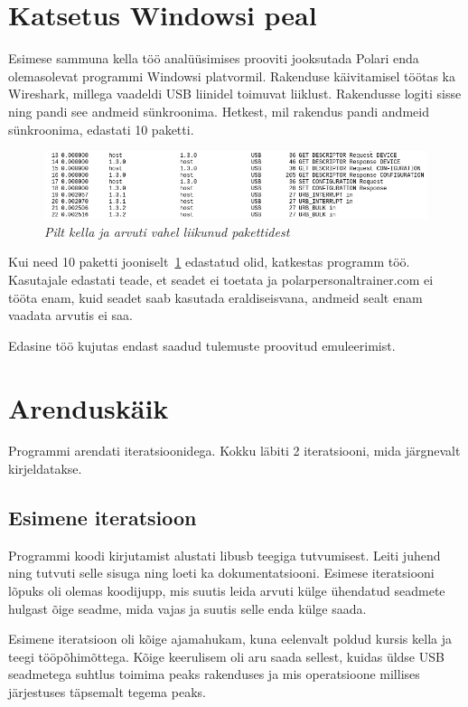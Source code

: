 
\section{Katsetus Windowsi peal}\label{sec:katsetus}
Esimese sammuna kella töö analüüsimises prooviti jooksutada Polari enda olemasolevat programmi Windowsi platvormil.
Rakenduse käivitamisel töötas ka Wireshark, millega vaadeldi USB liinidel toimuvat liiklust.
Rakendusse logiti sisse ning pandi see andmeid sünkroonima.
Hetkest, mil rakendus pandi andmeid sünkroonima, edastati 10 paketti.

\begin{figure}[ht]
    \centering
    \includegraphics[width=.9\textwidth]{figures/wireshark_packets.png}
    \caption{\textit{Pilt kella ja arvuti vahel liikunud pakettidest}}
    \label{fig:packets}
\end{figure}

Kui need 10 paketti jooniselt~\ref{fig:packets} edastatud olid, katkestas programm töö.
Kasutajale edastati teade, et seadet ei toetata ja polarpersonaltrainer.com ei tööta enam, kuid seadet saab kasutada eraldiseisvana, andmeid sealt enam vaadata arvutis ei saa.

Edasine töö kujutas endast saadud tulemuste proovitud emuleerimist.

\section{Arenduskäik}\label{sec:arendus}
Programmi arendati iteratsioonidega.
Kokku läbiti 2 iteratsiooni, mida järgnevalt kirjeldatakse.

\subsection{Esimene iteratsioon}
Programmi koodi kirjutamist alustati libusb teegiga tutvumisest.
Leiti juhend ning tutvuti selle sisuga ning loeti ka dokumentatsiooni.
Esimese iteratsiooni lõpuks oli olemas koodijupp, mis suutis leida arvuti külge ühendatud seadmete hulgast õige seadme, mida vajas ja suutis selle enda külge saada.

Esimene iteratsioon oli kõige ajamahukam, kuna eelenvalt poldud kursis kella ja teegi tööpõhimõttega. 
Kõige keerulisem oli aru saada sellest, kuidas üldse USB seadmetega suhtlus toimima peaks rakenduses ja mis operatsioone millises järjestuses täpsemalt tegema peaks.

